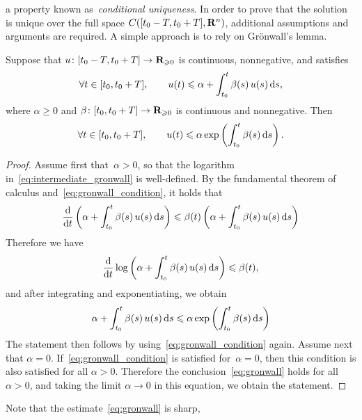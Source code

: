 a property known as~\emph{conditional uniqueness}.
In order to prove that the solution is unique over the full space $C([t_0-T, t_0+T], \mathbf R^n)$,
additional assumptions and arguments are required.
A simple approach is to rely on Gr\"onwall's lemma.
\begin{lemma}
    Suppose that $u \colon [t_0-T, t_0+T] \to \mathbf R_{\geqslant 0}$ is continuous, nonnegative, and satisfies
    \begin{equation}
        \label{eq:gronwall_condition}
        \forall t \in [t_0, t_0+T], \qquad
        u(t) \leqslant \alpha + \int_{t_0}^{t} \beta(s) \, u(s) \, \mathrm d s,
    \end{equation}
    where $\alpha \geq 0$ and $\beta\colon [t_0, t_0 + T] \to \mathbf R_{\geqslant 0}$ is continuous and nonnegative.
    Then
    \begin{equation}
        \label{eq:gronwall}
        \forall t \in [t_0, t_0+T], \qquad
        u(t) \leqslant \alpha \exp \left( \int_{t_0}^{t} \beta(s) \, \mathrm d s \right).
    \end{equation}
\end{lemma}
\begin{proof}
    Assume first that~$\alpha > 0$,
    so that the logarithm in~\eqref{eq:intermediate_gronwall} is well-defined.
    By the fundamental theorem of calculus and~\eqref{eq:gronwall_condition},
    it holds that
    \[
        \frac{\mathrm d}{\mathrm d t} \left( \alpha + \int_{t_0}^{t} \beta(s) \, u(s) \, \mathrm d s \right)
        \leqslant \beta(t) \left( \alpha + \int_{t_0}^{t} \beta(s) \, u(s) \, \mathrm d s \right)
    \]
    Therefore we have
    \begin{equation}
        \label{eq:intermediate_gronwall}
        \frac{\mathrm d}{\mathrm d t} \log \left( \alpha + \int_{t_0}^{t} \beta(s) \, u(s) \, \mathrm d s \right) \leqslant \beta(t),
    \end{equation}
    and after integrating and exponentiating,
    we obtain
    \[
        \alpha + \int_{t_0}^{t} \beta(s) \, u(s) \, \mathrm d s
        \leqslant \alpha \exp \left( \int_{t_0}^{t} \beta(s) \, \mathrm d s \right)
    \]
    The statement then follows by using~\eqref{eq:gronwall_condition} again.
    Assume next that $\alpha = 0$.
    If~\eqref{eq:gronwall_condition} is satisfied for~$\alpha = 0$,
    then this condition is also satisfied for all $\alpha > 0$.
    Therefore the conclusion~\eqref{eq:gronwall} holds for all~$\alpha > 0$,
    and taking the limit $\alpha \to 0$ in this equation,
    we obtain the statement.
\end{proof}
Note that the estimate~\eqref{eq:gronwall} is sharp,

